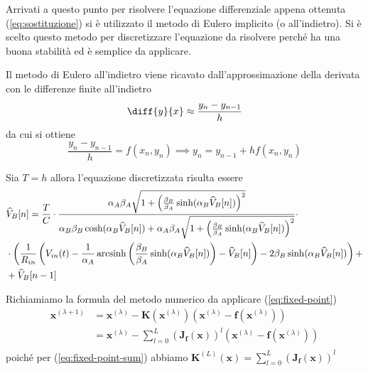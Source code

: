 	Arrivati a questo punto per risolvere l'equazione differenziale appena ottenuta (\ref{eq:sostituzione}) si è utilizzato il metodo di Eulero implicito (o all'indietro). Si è scelto questo metodo per discretizzare l'equazione da risolvere perché ha una buona stabilità ed è semplice da applicare.
	
	Il metodo di Eulero all'indietro viene ricavato dall'approssimazione della derivata con le differenze finite all'indietro
	\[
		\diff{y}{x} \approx \frac{y_{n}-y_{n-1}}{h}
	\]
	da cui si ottiene
	\[
		\frac{y_{n}-y_{n-1}}{h} = f(x_{n},y_{n}) \implies y_{n} = y_{n-1}+hf(x_{n},y_{n})
	\]
	
	
	Sia $T = h$ allora l'equazione discretizzata risulta essere
	\begin{equation}
		\label{eq:discretizzazione}
		\begin{split}
			&\widehat V_{B}[n] = \frac{T}{C}\cdot\frac{\alpha_{A}\beta_{A}\sqrt{1+\left(\frac{\beta_{B}}{\beta_{A}}\sinh(\alpha_{B}\widehat V_{B}[n])\right)^{2}}}{\alpha_{B}\beta_{B}\cosh(\alpha_{B}\widehat V_{B}[n])+\alpha_{A}\beta_{A}\sqrt{1+\left(\frac{\beta_{B}}{\beta_{A}}\sinh(\alpha_{B}\widehat V_{B}[n])\right)^{2}}}\cdot\\&\cdot\left(\frac{1}{R_{in}}\left(V_{in}(t)-\frac{1}{\alpha_{A}} \operatorname{arcsinh} \left(\frac{\beta_{B}}{\beta_{A}} \sinh(\alpha_{B}\widehat V_{B}[n])\right)-\widehat V_{B}[n]\right)-2\beta_{B}\sinh(\alpha_{B}\widehat V_{B}[n])\right)+\\&+\widehat V_{B}[n-1]\\
		\end{split}
	\end{equation}
	\pagebreak
	
	Richiamiamo la formula del metodo numerico da applicare (\ref{eq:fixed-point})
	\begin{equation}
		\label{eq:punto_fisso1}
		\begin{split}
			\mathbf{x}^{(\lambda+1)} &= \mathbf{x}^{(\lambda)}-\mathbf{K}(\mathbf{x}^{(\lambda)})(\mathbf{x}^{(\lambda)}-\mathbf{f}(\mathbf{x}^{(\lambda)}))\\
			&= \mathbf{x}^{(\lambda)}-\sum_{l=0}^{L} \left(\mathbf{J_{f}(x)}\right)^{l}(\mathbf{x}^{(\lambda)}-\mathbf{f}(\mathbf{x}^{(\lambda)}))\\
		\end{split}
	\end{equation}
	poiché per (\ref{eq:fixed-point-sum}) abbiamo $\mathbf{K}^{(L)}(\mathbf{x}) = \sum_{l=0}^{L} \left(\mathbf{J_{f}(x)}\right)^{l}$\\
	
